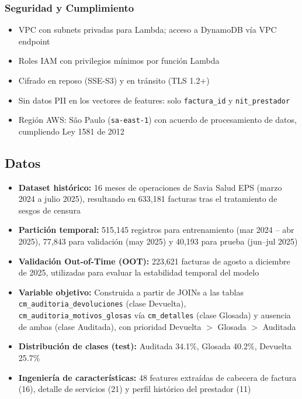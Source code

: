 \documentclass[12pt,letterpaper]{report}
\newcommand{\idb}{\discretionary{}{}{}}
\begin{document}
\subsubsection{Seguridad y Cumplimiento}

\begin{itemize}
    \item VPC con subnets privadas para Lambda; acceso a DynamoDB vía VPC endpoint
    \item Roles IAM con privilegios mínimos por función Lambda
    \item Cifrado en reposo (SSE-S3) y en tránsito (TLS 1.2+)
    \item Sin datos PII en los vectores de features: solo \texttt{factura\_id} y \texttt{nit\_prestador}
    \item Región AWS: São Paulo (\texttt{sa-east-1}) con acuerdo de procesamiento de datos, cumpliendo Ley 1581 de 2012
\end{itemize}

\subsection{Datos}

\begin{itemize}
    \item \textbf{Dataset histórico:} 16 meses de operaciones de Savia Salud EPS (marzo 2024 a julio 2025), resultando en 633,181 facturas tras el tratamiento de sesgos de censura
    \item \textbf{Partición temporal:} 515,145 registros para entrenamiento (mar 2024 -- abr 2025), 77,843 para validación (may 2025) y 40,193 para prueba (jun--jul 2025)
    \item \textbf{Validación Out-of-Time (OOT):} 223,621 facturas de agosto a diciembre de 2025, utilizadas para evaluar la estabilidad temporal del modelo
    \item \textbf{Variable objetivo:} Construida a partir de JOINs a las tablas
    \texttt{cm\_\idb auditoria\_\idb devoluciones} (clase Devuelta),
    \texttt{cm\_\idb auditoria\_\idb motivos\_\idb glosas} vía \texttt{cm\_\idb detalles}
    (clase Glosada) y ausencia de ambas (clase Auditada), con prioridad
    Devuelta $>$ Glosada $>$ Auditada
    \item \textbf{Distribución de clases (test):} Auditada 34.1\%, Glosada 40.2\%, Devuelta 25.7\%
    \item \textbf{Ingeniería de características:} 48 features extraídas de cabecera de factura (16), detalle de servicios (21) y perfil histórico del prestador (11)
\end{itemize}
\end{document}
